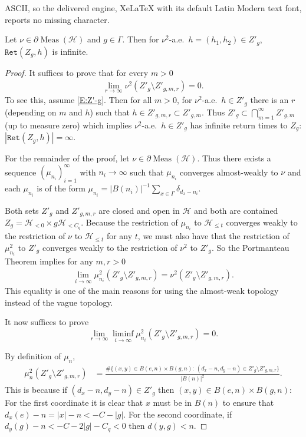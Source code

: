 \documentclass[10pt,a4paper]{amsart}
\def\cH{{\mathcal{H}}} \def\cI{{\mathcal{I}}} \def\cJ{{\mathcal{J}}} \def\cK{{\mathcal{K}}} \def\cL{{\mathcal{L}}} \def\cM{{\mathcal{M}}} \def\cN{{\mathcal{N}}} \def\cO{{\mathcal{O}}} \def\cP{{\mathcal{P}}} \def\cQ{{\mathcal{Q}}} \def\cR{{\mathcal{R}}} \def\cS{{\mathcal{S}}} \def\cT{{\mathcal{T}}} \def\cU{{\mathcal{U}}} \def\cV{{\mathcal{V}}} \def\cW{{\mathcal{W}}} \def\cX{{\mathcal{X}}} \def\cY{{\mathcal{Y}}} \def\cZ{{\mathcal{Z}}}
\newcommand\Meas{{\operatorname{Meas}}}
\newcommand\Ret{\mathtt{Ret}}
\newcommand{\G}{\Gamma}
\begin{document}
ASCII, so the delivered engine, XeLaTeX with its default Latin Modern text font, reports no missing character.
\begin{lem}\label{L:half-way}
Let $\nu \in \partial\Meas(\cH)$ and $g\in \G$. 
Then for $\nu^2$-a.e.\ $h=(h_1,h_2)\in Z'_g$, $\Ret(Z_g, h)$ is infinite.
\end{lem}

\begin{proof}
It suffices to prove that for every $m>0$ %
\begin{align}\label{E:Z'-g}
 \lim_{r\to\infty}   \nu^2(Z'_g \setminus Z'_{g,m,r})=0.
\end{align}
To see this, assume \eqref{E:Z'-g}. Then for all $m>0$, for $\nu^2$-a.e.\ $h \in Z'_g$ there is an $r$ (depending on $m$ and $h$) such that $h\in Z'_{g,m,r} \subset Z'_{g,m}$. Thus $Z'_g \subset \bigcap_{m=1}^\infty  Z'_{g,m}$ (up to measure zero) which implies $\nu^2$-a.e.\ $h\in Z'_g$ has 
infinite return times to $Z_g$: $|\Ret(Z_g, h)|=\infty$.



For the remainder of the proof, let $\nu \in \partial\Meas(\cH)$. Thus there exists a sequence $(\mu_{n_i})_{i=1}^\infty$ with $n_i\to\infty$ such that $\mu_{n_i}$ converges almost-weakly to $\nu$ and each $\mu_{n_i}$ is of the form $\mu_{n_i}=|B(n_i)|^{-1}\sum_{x\in\G} \delta_{d_x-n_i}$.

Both sets $Z'_g$ and $Z'_{g,m,r}$ are closed and open in $\cH$ and both are contained $Z_g = \cH_{<0} \times g\cH_{<C_q}$. Because the restriction of $\mu_{n_i}$ to $\cH_{\le t}$ converges weakly to the restriction of $\nu$ to $\cH_{\le t}$ for any $t$, we must also have that the restriction of $\mu^2_{n_i}$ to $Z'_g$ converges weakly to the restriction of $\nu^2$ to $Z'_g$.   So the Portmanteau Theorem implies for any $m,r>0$
\begin{align}
 \lim_{i\to\infty}  \mu^2_{n_i}(Z'_g \setminus Z'_{g,m,r})= \nu^2(Z'_g \setminus Z'_{g,m,r}).
\end{align}
This equality is one of the main reasons for using the almost-weak topology instead of the vague topology. 

It now suffices to prove 
$$\lim_{r\to\infty} \liminf_{i\to\infty}  \mu^2_{n_i}(Z'_g \setminus Z'_{g,m,r}) = 0.$$

By definition of $\mu_{n}$, 
\begin{align*}
\mu^2_n(  Z'_g \setminus Z'_{g,m,r}) &= \frac{\#\{(x,y) \in B(e,n)\times B(g,n):~(d_x-n,d_y-n) \in Z'_g \setminus Z'_{g,m,r}\}}{|B(n)|^2}.
\end{align*}
This is because if $(d_x-n,d_y-n) \in Z'_g$ then $(x,y) \in B(e,n)\times B(g,n)$:
For the first coordinate it is clear that $x$ must be in $B(n)$ to ensure that $d_x(e)-n = |x| - n<-C-|g|$. 
For the second coordinate, if $d_y(g)-n<-C-2|g|-C_q<0$ then $d(y,g)<n$.


\end{proof}
\end{document}
